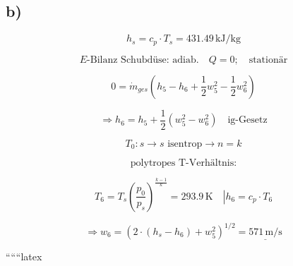 

\subsection*{b)}

\[
h_s = c_p \cdot T_s = 431.49 \, \text{kJ/kg}
\]

\[
E\text{-Bilanz Schubdüse: adiab.} \quad Q = 0; \quad \text{stationär}
\]

\[
0 = \dot{m}_{ges} \left( h_5 - h_6 + \frac{1}{2} w_5^2 - \frac{1}{2} w_6^2 \right)
\]

\[
\Rightarrow h_6 = h_5 + \frac{1}{2} (w_5^2 - w_6^2) \quad \text{ig-Gesetz}
\]

\[
T_0: s \rightarrow s \text{ isentrop} \rightarrow n = k
\]

\[
\text{polytropes T-Verhältnis:}
\]

\[
T_6 = T_s \left( \frac{p_0}{p_s} \right)^{\frac{k-1}{k}} = 293.9 \, \text{K} \quad \left| h_6 = c_p \cdot T_6 \right.
\]

\[
\Rightarrow w_6 = \left( 2 \cdot (h_s - h_6) + w_5^2 \right)^{1/2} = \underline{571 \, \text{m/s}}
\]


``````latex